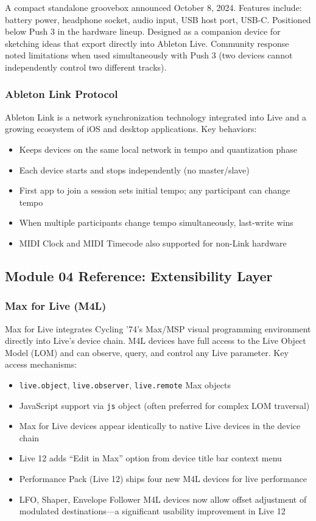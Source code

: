 \documentclass[11pt,letterpaper]{article}
\begin{document}
A compact standalone groovebox announced October 8, 2024. Features include: battery power,
headphone socket, audio input, USB host port, USB-C. Positioned below Push 3 in the hardware
lineup. Designed as a companion device for sketching ideas that export directly into Ableton
Live. Community response noted limitations when used simultaneously with Push 3 (two devices
cannot independently control two different tracks).

\subsubsection{Ableton Link Protocol}

Ableton Link is a network synchronization technology integrated into Live and a growing
ecosystem of iOS and desktop applications. Key behaviors:
\begin{itemize}[leftmargin=1.5em]
  \item Keeps devices on the same local network in tempo and quantization phase
  \item Each device starts and stops independently (no master/slave)
  \item First app to join a session sets initial tempo; any participant can change tempo
  \item When multiple participants change tempo simultaneously, last-write wins
  \item MIDI Clock and MIDI Timecode also supported for non-Link hardware
\end{itemize}

\subsection{Module 04 Reference: Extensibility Layer}

\subsubsection{Max for Live (M4L)}

Max for Live integrates Cycling '74's Max/MSP visual programming environment directly into
Live's device chain. M4L devices have full access to the Live Object Model (LOM) and can
observe, query, and control any Live parameter. Key access mechanisms:

\begin{itemize}[leftmargin=1.5em]
  \item \texttt{live.object}, \texttt{live.observer}, \texttt{live.remote} Max objects
  \item JavaScript support via \texttt{js} object (often preferred for complex LOM traversal)
  \item Max for Live devices appear identically to native Live devices in the device chain
  \item Live 12 adds ``Edit in Max'' option from device title bar context menu
  \item Performance Pack (Live 12) ships four new M4L devices for live performance
  \item LFO, Shaper, Envelope Follower M4L devices now allow offset adjustment of modulated
  destinations---a significant usability improvement in Live 12
\end{itemize}
\end{document}
